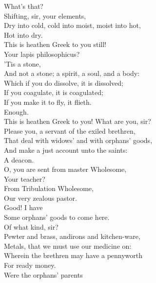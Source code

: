 \documentclass{memoir}
\begin{document}
\begin{drama*}
 What's that?\\
\facespeaks {} Shifting, sir, your elements,\\
 Dry into cold, cold into moist, moist into hot,\\
 Hot into dry.\\
\subtlespeaks {} This is heathen Greek to you still!\\
 Your lapis philosophicus?\\
\facespeaks {} 'Tis a stone,\\
 And not a stone; a spirit, a soul, and a body:\\
 Which if you do dissolve, it is dissolved;\\
 If you coagulate, it is coagulated;\\
 If you make it to fly, it flieth.\\
\subtlespeaks {} Enough.\\
 This is heathen Greek to you! What are you, sir?\\
\ananiasspeaks  Please you, a servant of the exiled brethren,\\
 That deal with widows' and with orphans' goods,\\
 And make a just account unto the saints:\\
 A deacon.\\
\subtlespeaks {} O, you are sent from master Wholesome,\\
 Your teacher?\\
\ananiasspeaks {} From Tribulation Wholesome,\\
 Our very zealous pastor.\\
\subtlespeaks {} Good! I have\\
 Some orphans' goods to come here.\\
\ananiasspeaks {} Of what kind, sir?\\
\subtlespeaks  Pewter and brass, andirons and kitchen-ware,\\
 Metals, that we must use our medicine on:\\
 Wherein the brethren may have a pennyworth\\
 For ready money.\\
\ananiasspeaks {} Were the orphans' parents\\

\end{drama*}
\end{document}

